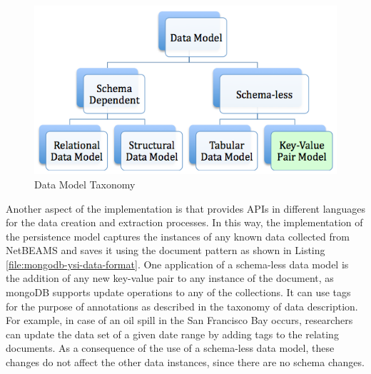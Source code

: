 \begin{figure}[h]
  \centering
  \includegraphics[scale=0.5]{../diagrams/taxonomy-data-model-modified}
  \caption{Data Model Taxonomy}
  \label{fig:taxonomy-data-model-modified}
\end{figure}

Another aspect of the implementation is that provides APIs in different
languages for the data creation and extraction processes. In this way, the
implementation of the persistence model captures the instances of any known
data collected from NetBEAMS and saves it using the document pattern as shown
in Listing \ref{file:mongodb-ysi-data-format}. One application of a
schema-less data model is the addition of any new key-value pair to any
instance of the document, as mongoDB supports update operations to any of the
collections. It can use tags for the purpose of annotations as described in the
taxonomy of data description. For example, in case of an oil spill in the San
Francisco Bay occurs, researchers can update the data set of a given date
range by adding tags to the relating documents. As a consequence of the use of
a schema-less data model, these changes do not affect the other data
instances, since there are no schema changes.

